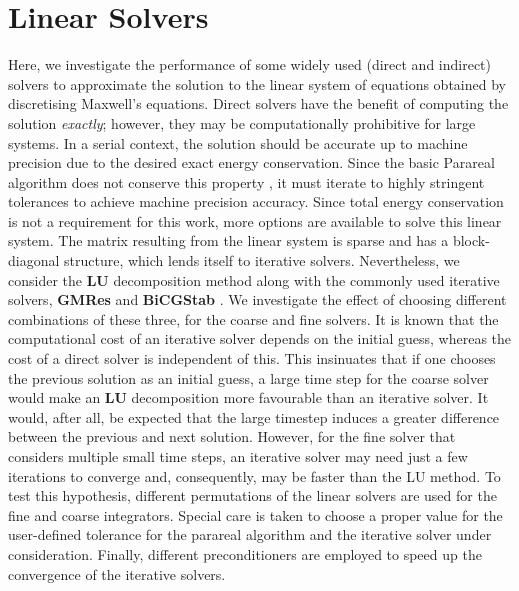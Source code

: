 
\section{Linear Solvers}

Here, we investigate the performance of some widely used (direct and indirect) solvers to approximate the solution to the linear system of equations obtained by discretising Maxwell's equations. Direct solvers have the benefit of computing the solution \textit{exactly}; however, they may be computationally prohibitive for large systems. In a serial context, the solution should be accurate up to machine precision due to the desired exact energy conservation. Since the basic Parareal algorithm does not conserve this property \cite{gander_analysis_2014}, it must iterate to highly stringent tolerances to achieve machine precision accuracy. Since total energy conservation is not a requirement for this work, more options are available to solve this linear system. The matrix resulting from the linear system is sparse and has a block-diagonal structure, which lends itself to iterative solvers. 
Nevertheless, we consider the \textbf{LU} decomposition method along with the commonly used iterative solvers, \textbf{GMRes} and \textbf{BiCGStab} \cite{youcef_saad_martin_h_schultz_gmres_1986,van_der_vorst_bi-cgstab_1992}. We investigate the effect of choosing different combinations of these three, for the coarse and fine solvers.    It is known that the computational cost of an iterative solver depends on the initial guess, whereas the cost of a direct solver is independent of this. This insinuates that if one chooses the previous solution as an initial guess, a large time step for the coarse solver would make an \textbf{LU} decomposition more favourable than an iterative solver. It would, after all, be expected that the large timestep induces a greater difference between the previous and next solution. However, for the fine solver that considers multiple small time steps, an iterative solver may need just a few iterations to converge and, consequently, may be faster than the LU method. To test this hypothesis, different permutations of the linear solvers are used for the fine and coarse integrators. Special care is taken to choose a proper value for the user-defined tolerance for the parareal algorithm and the iterative solver under consideration. Finally, different preconditioners are employed to speed up the convergence of the iterative solvers.

